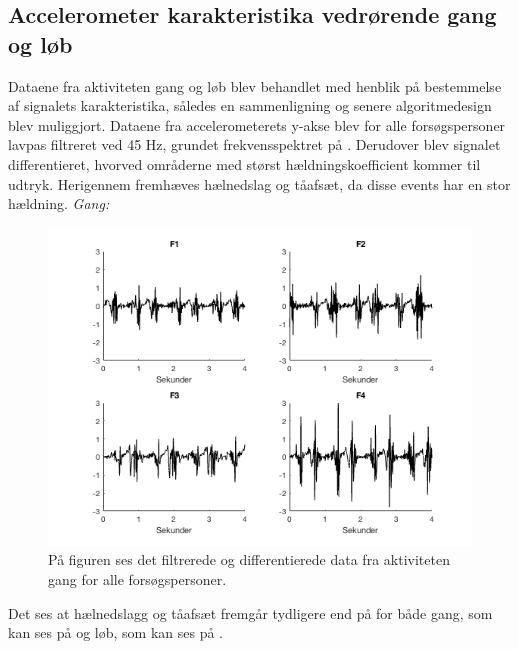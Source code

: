 \subsection{Accelerometer karakteristika vedrørende gang og løb}
Dataene fra aktiviteten gang og løb blev behandlet med henblik på bestemmelse af signalets karakteristika, således en sammenligning og senere algoritmedesign blev muliggjort. Dataene fra accelerometerets y-akse blev for alle forsøgspersoner lavpas filtreret ved 45 Hz, grundet frekvensspektret på . Derudover blev signalet differentieret, hvorved områderne med størst hældningskoefficient kommer til udtryk. Herigennem fremhæves hælnedslag og tåafsæt, da disse events har en stor hældning.
\newpage
\textit{Gang:}
\begin{figure}[H]
	\centering
	\includegraphics[scale=0.6]{figures/qBilag/gang_diff}
	\caption{På figuren ses det filtrerede og differentierede data fra aktiviteten gang for alle forsøgspersoner.}
	\label{fig:Ap_gangdiff}
\end{figure}

Det ses at hælnedslagg og tåafsæt fremgår tydligere end på  for både gang, som kan ses på  og løb, som kan ses på .

